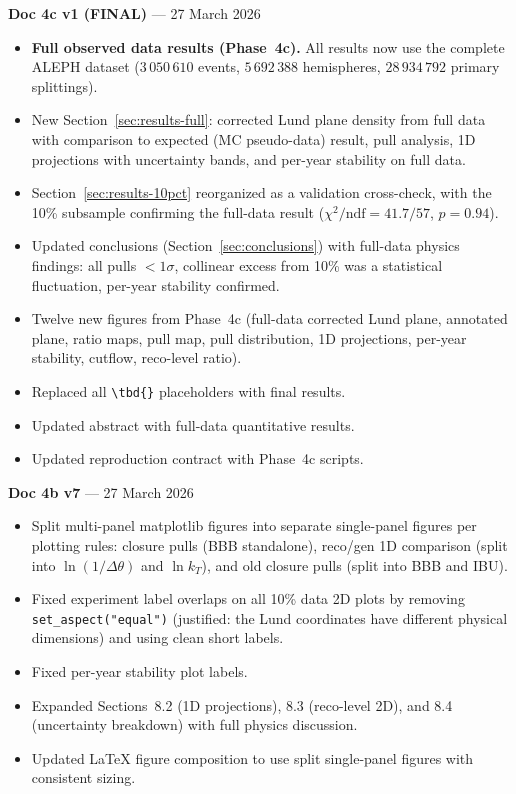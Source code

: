 \documentclass[11pt,a4paper]{article}
\newcommand{\tbd}[1]{\textcolor{gray}{\textit{#1}}}
\begin{document}
\textbf{Doc 4c v1 (FINAL)} --- 27 March 2026
\begin{itemize}
\item \textbf{Full observed data results (Phase~4c).}  All results now use the complete ALEPH dataset ($3\,050\,610$ events, $5\,692\,388$ hemispheres, $28\,934\,792$ primary splittings).
\item New Section~\ref{sec:results-full}: corrected Lund plane density from full data with comparison to expected (MC pseudo-data) result, pull analysis, 1D projections with uncertainty bands, and per-year stability on full data.
\item Section~\ref{sec:results-10pct} reorganized as a validation cross-check, with the 10\% subsample confirming the full-data result ($\chi^2/\text{ndf} = 41.7/57$, $p = 0.94$).
\item Updated conclusions (Section~\ref{sec:conclusions}) with full-data physics findings: all pulls $< 1\sigma$, collinear excess from 10\% was a statistical fluctuation, per-year stability confirmed.
\item Twelve new figures from Phase~4c (full-data corrected Lund plane, annotated plane, ratio maps, pull map, pull distribution, 1D projections, per-year stability, cutflow, reco-level ratio).
\item Replaced all \verb|\tbd{}| placeholders with final results.
\item Updated abstract with full-data quantitative results.
\item Updated reproduction contract with Phase~4c scripts.
\end{itemize}

\medskip

\textbf{Doc 4b v7} --- 27 March 2026
\begin{itemize}
\item Split multi-panel matplotlib figures into separate single-panel figures per plotting rules: closure pulls (BBB standalone), reco/gen 1D comparison (split into $\ln(1/\Delta\theta)$ and $\ln k_T$), and old closure pulls (split into BBB and IBU).
\item Fixed experiment label overlaps on all 10\% data 2D plots by removing \texttt{set\_aspect("equal")} (justified: the Lund coordinates have different physical dimensions) and using clean short labels.
\item Fixed per-year stability plot labels.
\item Expanded Sections~8.2 (1D projections), 8.3 (reco-level 2D), and 8.4 (uncertainty breakdown) with full physics discussion.
\item Updated LaTeX figure composition to use split single-panel figures with consistent sizing.
\end{itemize}
\end{document}
